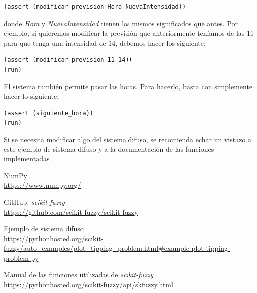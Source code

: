 \documentclass[11pt,a4paper]{article}
\begin{document}
\begin{lstlisting}
(assert (modificar_prevision Hora NuevaIntensidad))
\end{lstlisting}

\noindent donde \textit{Hora} y \textit{NuevaIntensidad} tienen los mismos significados que antes. Por ejemplo, si quieremos
modificar la previsión que anteriormente teníamos de las 11 para que tenga una intensidad de 14, debemos hacer los siguiente:

\begin{lstlisting}
(assert (modificar_prevision 11 14))
(run)
\end{lstlisting}

El sistema también permite pasar las horas. Para hacerlo, basta con simplemente hacer lo siguiente:

\begin{lstlisting}
(assert (siguiente_hora))
(run)
\end{lstlisting}

Si se necesita modificar algo del sistema difuso, se recomienda echar un vistazo a este ejemplo de sistema difuso
\cite{bib:fuzzy-example} y a la documentación de las funciones implementadas \cite{bib:skfuzzy-tutorial}.

\newpage

\begin{thebibliography}{5}

NumPy
\\\url{https://www.numpy.org/}

GitHub. \textit{scikit-fuzzy}
\\\url{https://github.com/scikit-fuzzy/scikit-fuzzy}

Ejemplo de sistema difuso
\\\url{https://pythonhosted.org/scikit-fuzzy/auto_examples/plot_tipping_problem.html#example-plot-tipping-problem-py}

Manual de las funciones utilizadas de \textit{scikit-fuzzy}
\\\url{https://pythonhosted.org/scikit-fuzzy/api/skfuzzy.html}


\end{thebibliography}
\end{document}
